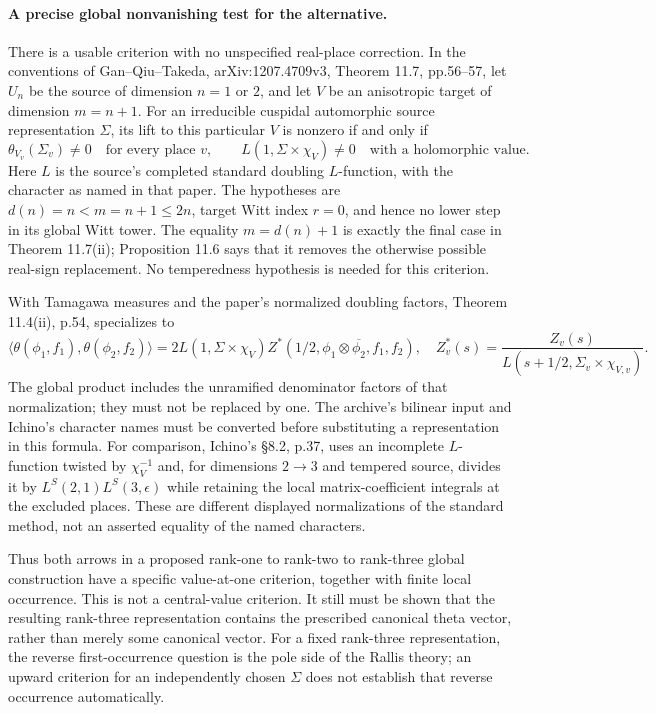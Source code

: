 \paragraph{A precise global nonvanishing test for the alternative.}
There is a usable criterion with no unspecified real-place correction. In the conventions of Gan--Qiu--Takeda, arXiv:1207.4709v3, Theorem 11.7, pp.56--57, let $U_n$ be the source of dimension $n=1$ or $2$, and let $V$ be an anisotropic target of dimension $m=n+1$. For an irreducible cuspidal automorphic source representation $\Sigma$, its lift to this particular $V$ is nonzero if and only if
\[
 \theta_{V_v}(\Sigma_v)\ne0\quad\text{for every place }v,
 \qquad L(1,\Sigma\times\chi_V)\ne0
       \quad\text{with a holomorphic value}.
 \tag{B15i}
\]
Here $L$ is the source's completed standard doubling $L$-function, with the character as named in that paper. The hypotheses are $d(n)=n<m=n+1\leq2n$, target Witt index $r=0$, and hence no lower step in its global Witt tower. The equality $m=d(n)+1$ is exactly the final case in Theorem 11.7(ii); Proposition 11.6 says that it removes the otherwise possible real-sign replacement. No temperedness hypothesis is needed for this criterion.

With Tamagawa measures and the paper's normalized doubling factors, Theorem 11.4(ii), p.54, specializes to
\[
 \langle\theta(\phi_1,f_1),\theta(\phi_2,f_2)\rangle
 =2L(1,\Sigma\times\chi_V)
       Z^*(1/2,\phi_1\otimes\overline{\phi_2},f_1,f_2),
 \quad
 Z_v^*(s)=\frac{Z_v(s)}{L(s+1/2,\Sigma_v\times\chi_{V,v})}.
 \tag{B15j}
\]
The global product includes the unramified denominator factors of that normalization; they must not be replaced by one. The archive's bilinear input and Ichino's character names must be converted before substituting a representation in this formula. For comparison, Ichino's \S8.2, p.37, uses an incomplete $L$-function twisted by $\chi_V^{-1}$ and, for dimensions $2\to3$ and tempered source, divides it by $L^S(2,1)L^S(3,\epsilon)$ while retaining the local matrix-coefficient integrals at the excluded places. These are different displayed normalizations of the standard method, not an asserted equality of the named characters.

Thus both arrows in a proposed rank-one to rank-two to rank-three global construction have a specific value-at-one criterion, together with finite local occurrence. This is not a central-value criterion. It still must be shown that the resulting rank-three representation contains the prescribed canonical theta vector, rather than merely some canonical vector. For a fixed rank-three representation, the reverse first-occurrence question is the pole side of the Rallis theory; an upward criterion for an independently chosen $\Sigma$ does not establish that reverse occurrence automatically.

